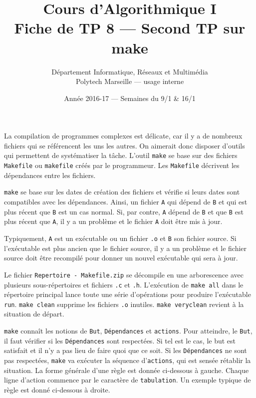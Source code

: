 \documentclass[12pt]{article} %
\title{\vspace*{-2cm}Cours d'Algorithmique I\\ Fiche de TP 8 --- Second TP sur make}
\author{Département Informatique, Réseaux et Multimédia\\
 Polytech Marseille --- usage interne}
\date{Année 2016-17 --- Semaines du 9/1 \& 16/1}
\begin{document}
\begin{sloppypar}

\maketitle

\thispagestyle{empty}

\vspace*{-4ex}
\noindent
La compilation de programmes complexes est délicate, car il y a de nombreux fichiers qui se référencent les uns les autres. On aimerait donc disposer d'outils qui permettent de systématiser la tâche. L'outil {\tt make} se base sur des fichiers {\tt Makefile} ou {\tt makefile} créés par le programmeur. Les {\tt Makefile} décrivent les dépendances entre les fichiers.\medskip

\noindent
 {\tt make} se base sur les dates de création des fichiers et vérifie si leurs dates sont compatibles avec les dépendances. Ainsi, un fichier {\tt A} qui dépend de {\tt B} et qui est plus récent que {\tt B} est un cas normal. Si, par contre, {\tt A} dépend de {\tt B} et que {\tt B} est plus récent que {\tt A}, il y a un problème et le fichier {\tt A} doit être mis à jour.\medskip

\noindent
Typiquement, {\tt A} est un exécutable ou un fichier {\tt .o} et {\tt B} son fichier source. Si l'exécutable est plus ancien que le fichier source, il y a un problème et le fichier source doit être recompilé pour donner un nouvel exécutable qui sera à jour.\medskip

\noindent
Le fichier {\tt Repertoire - Makefile.zip} se décompile en une arborescence avec plusieurs sous-répertoires et fichiers {\tt .c} et {\tt .h}. L'exécution de {\tt make all} dans le répertoire principal lance toute une série d'opérations pour produire l'exécutable {\tt run}.  {\tt make clean} supprime les fichiers {\tt .o} inutiles. {\tt make veryclean} revient à la situation de départ.\medskip

\noindent
{\tt make} connaît les notions de {\tt But}, {\tt Dépendances} et {\tt actions}. Pour atteindre, le {\tt But}, il faut vérifier si les {\tt Dépendances} sont respectées. Si tel est le cas, le but est satisfait et il n'y a pas lieu de faire quoi que ce soit. Si les {\tt Dépendances} ne sont pas respectées, {\tt make} va exécuter la séquence d'{\tt actions}, qui est sensée rétablir la situation. La forme générale d'une règle est donnée ci-dessous à gauche. Chaque ligne d'action commence par le caractère de {\tt tabulation}. Un exemple typique de règle est donné ci-dessous à droite.\bigskip



\end{sloppypar}
\end{document}
